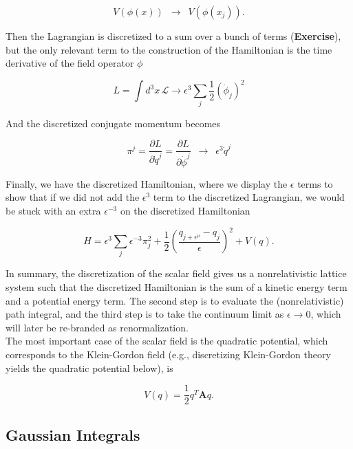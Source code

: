 \begin{equation}
V(\phi(x)) \,\,\, \rightarrow \,\,\, V(\phi(x_j)).
\end{equation}

\noindent Then the Lagrangian is discretized to a sum over a bunch of terms (\textbf{Exercise}), but the only relevant term to the construction of the Hamiltonian is the time derivative of the field operator $\dot{\phi}$

\begin{equation}
L = \int d^3 x \, \mathcal{L} \rightarrow \epsilon^3 \sum_j \frac{1}{2} (\dot{\phi}_j)^2
\end{equation}

\noindent And the discretized conjugate momentum becomes

\begin{equation}
\pi^j = \frac{\partial L}{\partial \dot{q}^j} = \frac{\partial L}{\partial \dot{\phi}^j}  \,\,\, \rightarrow \,\,\, \epsilon^3 \dot{q}^j
\end{equation}

\noindent Finally, we have the discretized Hamiltonian, where we display the $\epsilon$ terms to show that if we did not add the $\epsilon^3$ term to the discretized Lagrangian, we would be stuck with an extra $\epsilon^{-3}$ on the discretized Hamiltonian

\begin{equation}
H = \epsilon^3 \sum_j \epsilon^{-3} \pi_j^2 + \frac{1}{2} \left( \frac{q_{j+\epsilon^\mu}-q_j}{\epsilon} \right)^2 + V(q).
\end{equation}

\noindent In summary, the discretization of the scalar field gives us a nonrelativistic lattice system such that the discretized Hamiltonian is the sum of a kinetic energy term and a potential energy term. The second step is to evaluate the (nonrelativistic) path integral, and the third step is to take the continuum limit as $\epsilon \rightarrow 0$, which will later be re-branded as renormalization. \\

\noindent The most important case of the scalar field is the quadratic potential, which corresponds to the Klein-Gordon field (e.g., discretizing Klein-Gordon theory yields the quadratic potential below), is

\begin{equation}
V(q) = \frac{1}{2} q^T \textbf{A} q.
\end{equation}

\subsection*{Gaussian Integrals}

